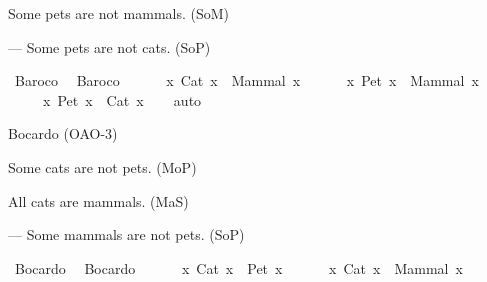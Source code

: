 \begin{isabellebody}
\begin{exercise}[subtitle=Silogizmi]
%
\begin{isamarkuptext}%
Some pets are not mammals. (SoM)%
\end{isamarkuptext}\isamarkuptrue%
%
\begin{isamarkuptext}%
— Some pets are not cats. (SoP)%
\end{isamarkuptext}\isamarkuptrue%
\isamarkupfalse%
\ Baroco{\isacharcolon}{\kern0pt}\ %
\isadelimproof
%
\endisadelimproof
%
\isatagproof
%
\endisatagproof
{\isafoldproof}%
%
\isadelimproof
\isanewline
%
\endisadelimproof
{}\isamarkupfalse%
\ Baroco{\isacharcolon}{\kern0pt}\ {\isachardoublequoteopen}\isanewline
\ \ \ \ {\isacharparenleft}{\kern0pt}{\isasymforall}\ x{\isachardot}{\kern0pt}\ Cat\ x\ {\isasymlongrightarrow}\ Mammal\ x{\isacharparenright}{\kern0pt}\ {\isasymand}\isanewline
\ \ \ \ {\isacharparenleft}{\kern0pt}{\isasymexists}\ x{\isachardot}{\kern0pt}\ Pet\ x\ {\isasymand}\ {\isasymnot}Mammal\ x{\isacharparenright}{\kern0pt}\ {\isasymlongrightarrow}\isanewline
\ \ \ \ {\isacharparenleft}{\kern0pt}{\isasymexists}\ x{\isachardot}{\kern0pt}\ Pet\ x\ {\isasymand}\ {\isasymnot}Cat\ x{\isacharparenright}{\kern0pt}{\isachardoublequoteclose}\isanewline
%
\isadelimproof
\ \ %
\endisadelimproof
%
\isatagproof
{}\isamarkupfalse%
\ auto%
\endisatagproof
{\isafoldproof}%
%
\isadelimproof
%
\endisadelimproof
%
\begin{isamarkuptext}%
Bocardo (OAO-3)%
\end{isamarkuptext}\isamarkuptrue%
%
\begin{isamarkuptext}%
Some cats are not pets. (MoP)%
\end{isamarkuptext}\isamarkuptrue%
%
\begin{isamarkuptext}%
All cats are mammals. (MaS)%
\end{isamarkuptext}\isamarkuptrue%
%
\begin{isamarkuptext}%
— Some mammals are not pets. (SoP)%
\end{isamarkuptext}\isamarkuptrue%
\isamarkupfalse%
\ Bocardo{\isacharcolon}{\kern0pt}\ %
\isadelimproof
%
\endisadelimproof
%
\isatagproof
%
\endisatagproof
{\isafoldproof}%
%
\isadelimproof
\isanewline
%
\endisadelimproof
{}\isamarkupfalse%
\ Bocardo{\isacharcolon}{\kern0pt}\ {\isachardoublequoteopen}\isanewline
\ \ \ \ {\isacharparenleft}{\kern0pt}{\isasymexists}\ x{\isachardot}{\kern0pt}\ Cat\ x\ {\isasymand}\ {\isasymnot}Pet\ x{\isacharparenright}{\kern0pt}\ {\isasymand}\isanewline
\ \ \ \ {\isacharparenleft}{\kern0pt}{\isasymforall}\ x{\isachardot}{\kern0pt}\ Cat\ x\ {\isasymlongrightarrow}\ Mammal\ x{\isacharparenright}{\kern0pt}\ {\isasymlongrightarrow}\isanewline

\end{exercise}
\end{isabellebody}
